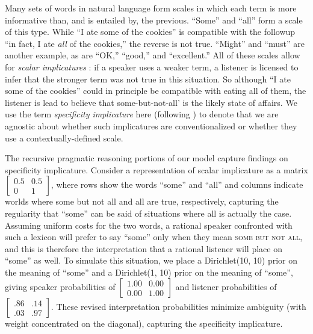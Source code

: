 \documentclass{article} %
\begin{document}
\label{sec:spec}

Many sets of words in natural language form scales in which each term
is more informative than, and is entailed by, the previous. ``Some'' and ``all'' form a scale of this
type. While ``I ate some of the cookies'' is compatible with the
followup ``in fact, I ate {\it all} of the cookies,'' the reverse is
not true. ``Might'' and ``must'' are another example, as are ``OK,''
``good,'' and ``excellent.'' All of these scales allow for {\it scalar
  implicatures} \cite{grice1975}: if a speaker uses a weaker term, a
listener is licensed to infer that the stronger term was not true in
this situation. So although ``I ate some of the cookies'' could in
principle be compatible with eating {\sc all} of them, the listener is lead
to believe that {\sc some-but-not-all}' is the likely state of
affairs. We use the term {\it specificity implicature} here (following
\cite{bergen2012}) to denote that we are agnostic about whether such
implicatures are conventionalized or whether they use a
contextually-defined scale.

The recursive pragmatic reasoning portions of our model capture
findings on specificity implicature. Consider a representation of
scalar implicature as a matrix $\left[
    \begin{array}{cc}
      0.5 & 0.5 \\
      0 & 1
    \end{array}
  \right]$, where rows show the words ``some'' and ``all'' and columns
  indicate worlds where {\sc some but not all} and {\sc all} are true,
  respectively, capturing the regularity that ``some'' can be said of
  situations where {\sc all} is actually the case. Assuming uniform
  costs for the two words, a rational speaker confronted with such a
  lexicon will prefer to say ``some'' only when they mean \textsc{some
    but not all}, and this is therefore the interpretation that a
  rational listener will place on ``some'' as well. To simulate this
  situation, we place a Dirichlet(10, 10) prior on the meaning of
``some'' and a Dirichlet(1, 10) prior on the meaning of
``some'', giving speaker probabilities of
  $\left[
    \begin{array}{cc}
      1.00 & 0.00 \\
      0.00 & 1.00
    \end{array}
  \right]$
and listener probabilities of
$\left[
    \begin{array}{cc}
      .86 & .14 \\
      .03 & .97
    \end{array}
  \right]$. These revised interpretation probabilities minimize
  ambiguity (with weight concentrated on the diagonal), capturing the specificity implicature.
  
\end{document}
